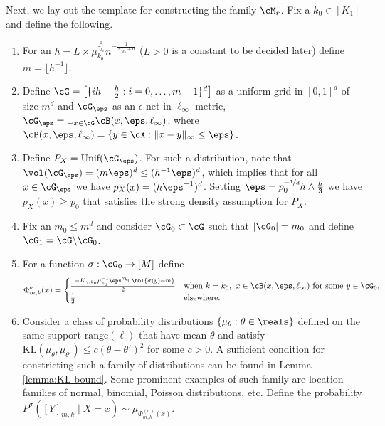 Next, we lay out the template for constructing the family $\cM_r$. Fix a $k_0 \in [K_1]$ and define the following. 
\begin{definition}
    \begin{enumerate}
    \item For an $h = L \times   \mu_{k_0}^{\frac{1}{\gamma_{k_0}}} n^{-\frac{1}{2\gamma_{k_0} + d}}$ ($L > 0$ is a constant to be decided later) define $m =  \lfloor h^{-1} \rfloor $.   
    \item  Define $\cG = \big[\{ ih + \frac{h}{2} : i = 0,  \dots, m - 1\}^d\big]$ as a uniform grid in $[0, 1]^d$ of size $m^d$ and $\cG_\eps$ as an $\epsilon$-net in $\ell_\infty$ metric, \ie\  $\cG_\eps = \cup_{x \in \cG} \cB(x, \eps, \ell_\infty) $, where $\cB(x, \eps, \ell_{\infty}) = \{y \in \cX : \|x-y\|_\infty \le \eps\}$.
    \item Define $P_X = \text{Unif}(\cG_\eps) $. For such a distribution, note that  $\vol (\cG_\eps) = (m\eps)^d \le (h^{-1}\eps)^d $, which implies that for all $x \in \cG_\eps$ we have $p_X(x) = (h\eps^{-1})^d $. Setting $\eps = p_0 ^{-\nicefrac{1}{d}} h \wedge \frac{h}{3}$ we have $p_X(x) \ge p_0$ that satisfies the strong density assumption for $P_X$.
    \item  Fix an $m_0 \le m^d$ and consider $\cG_0 \subset \cG$ such that $|\cG_0| =m_0$ and define $\cG_1 = \cG \backslash \cG_0$.
    \item  For a function $\sigma: \cG_0 \to [M]$ define \begin{equation}
    \Phi_{m, k}^{\sigma}(x) = \begin{cases}
     \frac{1 - K_{\gamma, k_0} \mu_{k_0}^{-1} \eps^{\gamma_{k_0}}\bbI\{\sigma(y) = m\}}{2} & \text{when} ~ k =k_0, ~  x \in\cB(x, \eps, \ell_{\infty})~ \text{for some}   ~  y \in \cG_0,\\
     \frac{1}{2} & \text{elsewhere.}
    \end{cases}
\end{equation}
\item    Consider a class of probability distributions $\{\mu_\theta: \theta \in \reals\}$ defined on the same support $\text{range}(\ell)$ that have mean $\theta$ and satisfy $\text{KL}(\mu_\theta, \mu_{\theta'})  \le c  (\theta - \theta')^2$ for some $c > 0$. A sufficient condition for constricting such a family of distributions can be found in Lemma \ref{lemma:KL-bound}. Some prominent examples of such family are location families of normal, binomial, Poisson distributions, etc.  Define the probability $P^\sigma([Y]_{m, k} \mid X = x) \sim \mu_{\Phi_{m, k}^{(\sigma)}(x)}$. 
\end{enumerate}
\end{definition}
